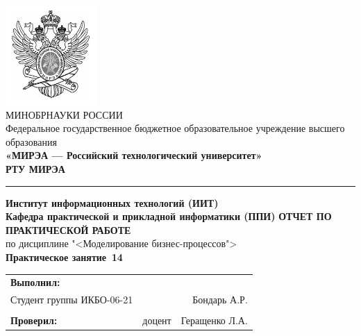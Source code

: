 \begin{titlepage}
	
	\thispagestyle{fancy}
	\renewcommand{\headrulewidth}{0pt}
	\setlength{\headheight}{17.0pt}

	\begin{center}
		\includegraphics[scale=0.5]{./res/logo}\\ %
		МИНОБРНАУКИ РОССИИ\\
		Федеральное государственное бюджетное образовательное
		учреждение высшего образования\\
		\textbf{«МИРЭА --- Российский технологический университет»}\\
		\textbf{\large РТУ МИРЭА}\\
		\bigskip \hrule \smallskip
		\textbf{
			Институт информационных технологий (ИИТ)\\
			Кафедра практической и прикладной информатики (ППИ)
		}
		\vfill
		\textbf{\large ОТЧЕТ ПО ПРАКТИЧЕСКОЙ РАБОТЕ}\\
		по дисциплине "<Моделирование бизнес-процессов">\\
		\vfill
		\textbf{
			Практическое занятие \No\,14\\
		}
		\vfill
		\vfill
		\begin{tabular}{lrr}
			\textbf{Выполнил:} & &\\
			Студент группы ИКБО-06-21 & & Бондарь А.Р. \\\\
			\textbf{Проверил:} &  доцент & Геращенко Л.А. \\
		\end{tabular}
		\vfill
	\end{center}
\end{titlepage}
\setcounter{page}{2}
\clearpage

